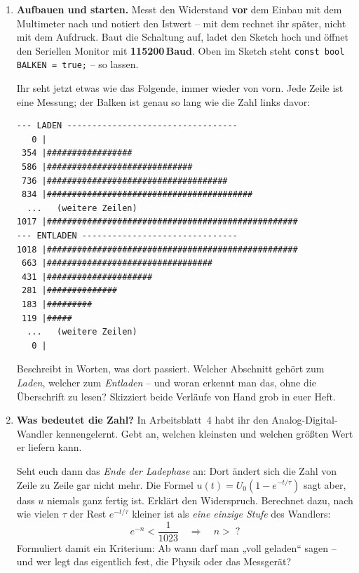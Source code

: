 \documentclass[a4paper,12pt]{scrartcl}
\begin{document}
\begin{enumerate}[leftmargin=2em, resume, itemsep=13pt, topsep=10pt]
\item \textbf{Aufbauen und starten.} Messt den Widerstand \textbf{vor} dem Einbau mit dem
Multimeter nach und notiert den Istwert -- mit dem rechnet ihr später, nicht mit dem Aufdruck.
Baut die Schaltung auf, ladet den Sketch hoch und öffnet den Seriellen Monitor mit
\textbf{115200\,Baud}. Oben im Sketch steht \texttt{const bool BALKEN = true;} -- so lassen.

\smallskip
\noindent\begin{minipage}{\linewidth}
Ihr seht jetzt etwas wie das Folgende, immer wieder von vorn. Jede Zeile ist eine Messung;
der Balken ist genau so lang wie die Zahl links davor:

\begin{lstlisting}[style=monitor]
--- LADEN ----------------------------------
   0 |
 354 |#################
 586 |#############################
 736 |####################################
 834 |#########################################
  ...   (weitere Zeilen)
1017 |##################################################
--- ENTLADEN -------------------------------
1018 |##################################################
 663 |#################################
 431 |#####################
 281 |##############
 183 |#########
 119 |#####
  ...   (weitere Zeilen)
   0 |
\end{lstlisting}
\end{minipage}

\noindent Beschreibt in Worten, was dort passiert. Welcher Abschnitt gehört zum \emph{Laden}, welcher zum
\emph{Entladen} -- und woran erkennt man das, ohne die Überschrift zu lesen? Skizziert beide
Verläufe von Hand grob in euer Heft.

\item \textbf{Was bedeutet die Zahl?} In Arbeitsblatt~4 habt ihr den Analog-Digital-Wandler
kennengelernt. Gebt an, welchen kleinsten und welchen größten Wert er liefern kann.

\smallskip
Seht euch dann das \emph{Ende der Ladephase} an: Dort ändert sich die Zahl von Zeile zu Zeile
gar nicht mehr. Die Formel $u(t)=U_0\left(1-e^{-t/\tau}\right)$ sagt aber, dass $u$ niemals
ganz fertig ist. Erklärt den Widerspruch. Berechnet dazu, nach wie vielen $\tau$ der Rest
$e^{-t/\tau}$ kleiner ist als \emph{eine einzige Stufe} des Wandlers:
\[
  e^{-n} < \frac{1}{1023} \quad\Longrightarrow\quad n > \;?
\]
Formuliert damit ein Kriterium: Ab wann darf man „voll geladen`` sagen -- und wer legt das
eigentlich fest, die Physik oder das Messgerät?


\end{enumerate}
\end{document}
